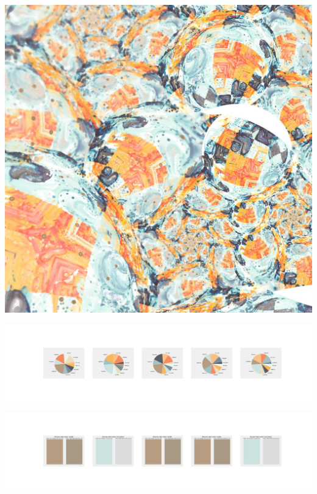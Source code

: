 \documentclass[11pt]{article}
\begin{document}
\begin{landscape}
    \begin{center}
    \includegraphics[width=\textwidth]{./nbimg/file (396).jpg}
    \end{center}

    \begin{center}
    \includegraphics[width=250mm]{./nbimg/pie-329.jpg}
    \end{center}

    \begin{center}
    \includegraphics[width=250mm]{./nbimg/peak-329.jpg}
    \end{center}
    


\end{landscape}
\end{document}

